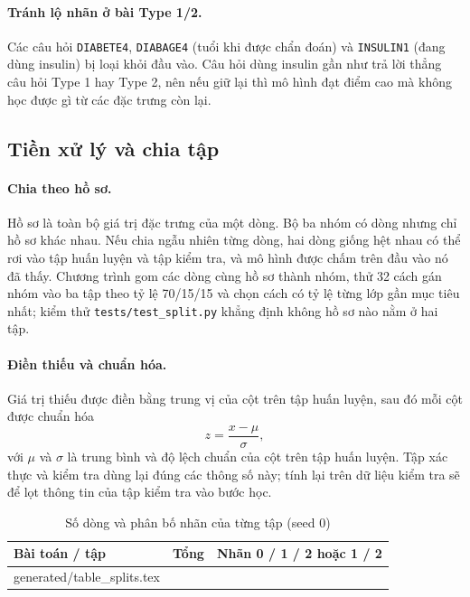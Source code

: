 \documentclass[11pt,a4paper]{article}
\makeatletter
\newcommand{\tablerows}[1]{\@@input #1 }
\makeatother
\begin{document}
\paragraph{Tránh lộ nhãn ở bài Type 1/2.}
Các câu hỏi \texttt{DIABETE4}, \texttt{DIABAGE4} (tuổi khi được chẩn đoán) và \texttt{INSULIN1} (đang dùng insulin)
bị loại khỏi đầu vào. Câu hỏi dùng insulin gần như trả lời thẳng câu hỏi Type 1 hay Type 2, nên nếu giữ lại thì
mô hình đạt điểm cao mà không học được gì từ các đặc trưng còn lại.

\subsection{Tiền xử lý và chia tập}

\paragraph{Chia theo hồ sơ.}
Hồ sơ là toàn bộ giá trị đặc trưng của một dòng. Bộ ba nhóm có \nRowsStatus{} dòng nhưng chỉ \nProfilesStatus{} hồ sơ
khác nhau. Nếu chia ngẫu nhiên từng dòng, hai dòng giống hệt nhau có thể rơi vào tập huấn luyện và tập kiểm tra,
và mô hình được chấm trên đầu vào nó đã thấy. Chương trình gom các dòng cùng hồ sơ thành nhóm, thử 32 cách gán
nhóm vào ba tập theo tỷ lệ 70/15/15 và chọn cách có tỷ lệ từng lớp gần mục tiêu nhất; kiểm thử
\texttt{tests/test\_split.py} khẳng định không hồ sơ nào nằm ở hai tập.

\paragraph{Điền thiếu và chuẩn hóa.}
Giá trị thiếu được điền bằng trung vị của cột trên tập huấn luyện, sau đó mỗi cột được chuẩn hóa
\[ z = \frac{x - \mu}{\sigma}, \]
với $\mu$ và $\sigma$ là trung bình và độ lệch chuẩn của cột trên tập huấn luyện. Tập xác thực và kiểm tra dùng lại
đúng các thông số này; tính lại trên dữ liệu kiểm tra sẽ để lọt thông tin của tập kiểm tra vào bước học.

\begin{table}[H]
\centering
\caption{Số dòng và phân bố nhãn của từng tập (seed 0)}
\begin{tabular}{lrl}
\toprule
Bài toán / tập & Tổng & Nhãn 0 / 1 / 2 hoặc 1 / 2 \\
\midrule
\tablerows{generated/table_splits.tex}
\bottomrule
\end{tabular}
\end{table}

\end{document}
